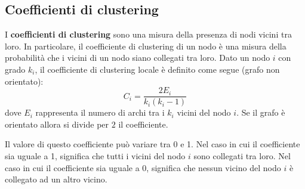 \subsection{Coefficienti di clustering}
\begin{definizione}
    I \textbf{coefficienti di clustering} sono una misura della presenza di nodi
    vicini tra loro. In particolare, il coefficiente di clustering di un nodo è una
    misura della probabilità che i vicini di un nodo siano collegati tra loro.
    Dato un nodo $i$ con grado $k_i$, il coefficiente di clustering locale è
    definito come segue (grafo non orientato):
    \begin{equation}
        C_i = \frac{2E_i}{k_i(k_i - 1)}
    \end{equation}
    dove $E_i$ rappresenta il numero di archi tra i $k_i$ vicini del nodo $i$.
    Se il grafo è orientato allora si divide per $2$ il coefficiente.
\end{definizione}

Il valore di questo coefficiente può variare tra 0 e 1. Nel caso in cui il
coefficiente sia uguale a 1, significa che tutti i vicini del nodo $i$ sono
collegati tra loro. Nel caso in cui il coefficiente sia uguale a 0, significa
che nessun vicino del nodo $i$ è collegato ad un altro vicino.

